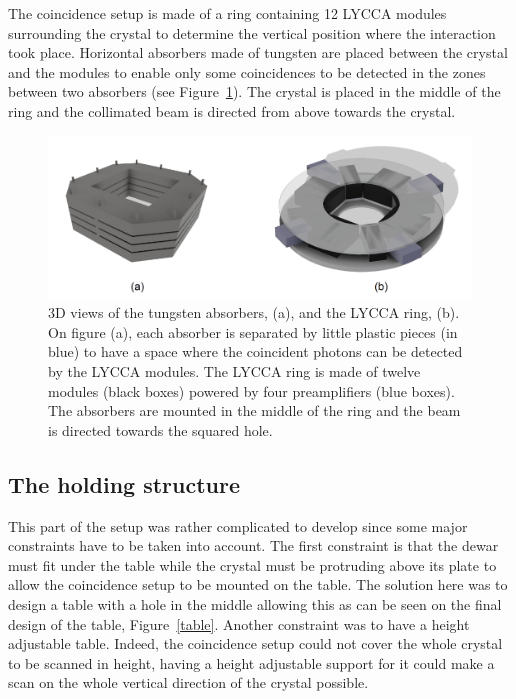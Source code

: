 \documentclass[11pt,a4paper]{article}
\begin{document}
The coincidence setup is made of a ring containing 12 LYCCA modules surrounding the crystal to determine the vertical position where the interaction took place. Horizontal absorbers made of tungsten are placed between the crystal and the modules to enable only some coincidences to be detected in the zones between two absorbers (see Figure~\ref{coïncidence}). The crystal is placed in the middle of the ring and the collimated beam is directed from above towards the crystal.

\begin{figure}[!h]
\centering
\includegraphics[scale=0.3]{coincidence.png}
\caption{3D views of the tungsten absorbers, (a), and the LYCCA ring, (b). On figure (a), each absorber is separated by little plastic pieces (in blue) to have a space where the coincident photons can be detected by the LYCCA modules. The LYCCA ring is made of twelve modules (black boxes) powered by four preamplifiers (blue boxes). The absorbers are mounted in the middle of the ring and the beam is directed towards the squared hole.}
\label{coïncidence}
\end{figure}

\subsection{The holding structure}

This part of the setup was rather complicated to develop since some major constraints have to be taken into account. The first constraint is that the dewar must fit under the table while the crystal must be protruding above its plate to allow the coincidence setup to be mounted on the table. The solution here was to design a table with a hole in the middle allowing this as can be seen on the final design of the table, Figure~\ref{table}. Another constraint was to have a height adjustable table. Indeed, the coincidence setup could not cover the whole crystal to be scanned in height, having a height adjustable support for it could make a scan on the whole vertical direction of the crystal possible.
\end{document}

